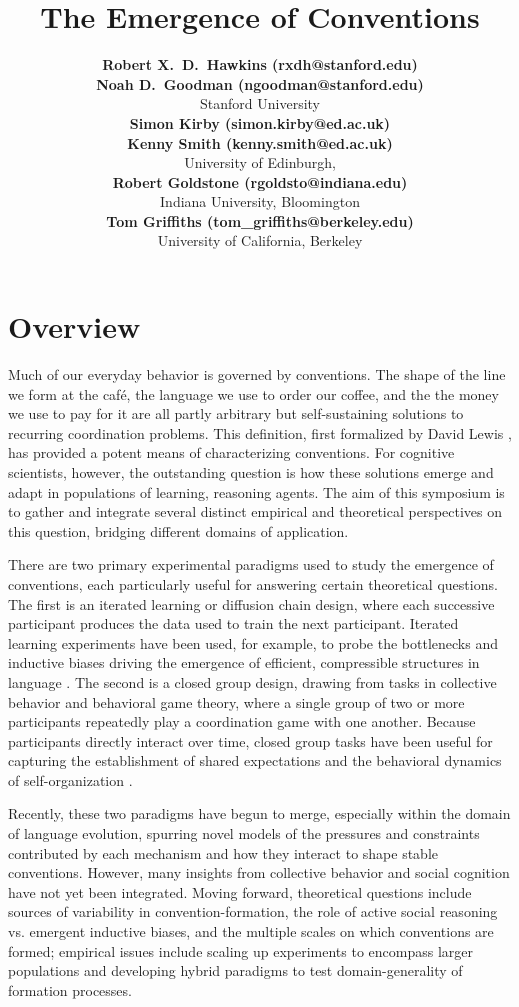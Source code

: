 \documentclass[10pt,letterpaper]{article}
\title{The Emergence of Conventions}
\author{
{\large \bf Robert X.~D.~Hawkins (rxdh@stanford.edu)} \\ 
{\large \bf Noah D.~Goodman (ngoodman@stanford.edu)}\\
  Stanford University \\
{\large \bf Simon Kirby (simon.kirby@ed.ac.uk)} \\
{\large \bf Kenny Smith (kenny.smith@ed.ac.uk)} \\
  University of Edinburgh, \\
{\large \bf Robert Goldstone (rgoldsto@indiana.edu)}\\
  Indiana University, Bloomington\\  
{\large \bf Tom Griffiths (tom\_griffiths@berkeley.edu)}\\
University of California, Berkeley}
\begin{document}
\maketitle

\section{Overview}

Much of our everyday behavior is governed by conventions. The shape of the line we form at the caf\'e, the language we use to order our coffee, and the the money we use to pay for it are all partly arbitrary but self-sustaining solutions to recurring coordination problems. This definition, first formalized by David Lewis \citeyear{Lewis69_Convention}, has provided a potent means of characterizing conventions. For cognitive scientists, however, the outstanding question is how these solutions emerge and adapt in populations of learning, reasoning agents. The aim of this symposium is to gather and integrate several distinct empirical and theoretical perspectives on this question, bridging different domains of application.

There are two primary experimental paradigms used to study the emergence of conventions, each particularly useful for answering certain theoretical questions. The first is an iterated learning or diffusion chain design, where each successive participant produces the data used to train the next participant. Iterated learning experiments have been used, for example, to probe the bottlenecks and inductive biases driving the emergence of efficient, compressible structures in language \cite{KirbyCornishSmith08_PNAS, GriffithsKalish07_LanguageEvolution}. The second is a closed group design, drawing from tasks in collective behavior and behavioral game theory, where a single group of two or more participants repeatedly play a coordination game with one another. Because participants directly interact over time, closed group tasks have been useful for capturing the establishment of shared expectations and the behavioral dynamics of self-organization \cite{GoldstoneGureckis09_Collective_Behavior_Review, CentolaBaronchelli15_ConventionEmergence}.

Recently, these two paradigms have begun to merge, especially within the domain of language evolution, spurring novel models of the pressures and constraints contributed by each mechanism and how they interact to shape stable conventions. However, many insights from collective behavior and social cognition have not yet been integrated. Moving forward, theoretical questions include sources of variability in convention-formation, the role of active social reasoning vs. emergent inductive biases, and the multiple scales on which conventions are formed; empirical issues include scaling up experiments to encompass larger populations and developing hybrid paradigms to test domain-generality of formation processes. 
\end{document}
